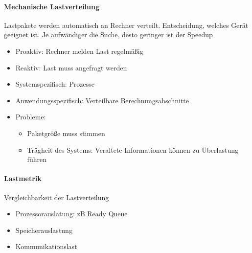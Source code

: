 \documentclass{scrartcl}
\begin{document}
\paragraph{Mechanische Lastverteilung} Lastpakete werden automatisch an Rechner verteilt. Entscheidung, welches Gerät geeignet ist. Je aufwändiger die Suche, desto geringer ist der Speedup
\begin{itemize}
\item Proaktiv: Rechner melden Last regelmäßig
\item Reaktiv: Last muss angefragt werden
\item Systemspezifisch: Prozesse
\item Anwendungsspezifisch: Verteilbare Berechnungsabschnitte
\item Probleme:
\begin{itemize}
\item Paketgröße muss stimmen
\item Trägheit des Systems: Veraltete Informationen können zu Überlastung führen
\end{itemize}
\end{itemize}

\paragraph{Lastmetrik} Vergleichbarkeit der Lastverteilung
\begin{itemize}
\item Prozessorauslatung: zB Ready Queue
\item Speicherauslastung
\item Kommunikationslast
\end{itemize}
\end{document}
